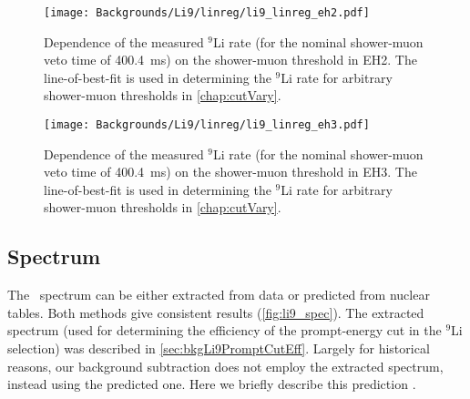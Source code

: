 \documentclass[../thesis.tex]{subfiles}
\begin{document}
\begin{figure}[ht]
  \texttt{[image: Backgrounds/Li9/linreg/li9\_linreg\_eh2.pdf]}
  \caption{Dependence of the measured $^9$Li rate (for the nominal shower-muon veto time of 400.4~ms) on the shower-muon threshold in EH2. The line-of-best-fit is used in determining the $^9$Li rate for arbitrary shower-muon thresholds in \autoref{chap:cutVary}.}
  \label{fig:li9_linreg_eh2}
\end{figure}

\begin{figure}[ht]
  \texttt{[image: Backgrounds/Li9/linreg/li9\_linreg\_eh3.pdf]}
  \caption{Dependence of the measured $^9$Li rate (for the nominal shower-muon veto time of 400.4~ms) on the shower-muon threshold in EH3. The line-of-best-fit is used in determining the $^9$Li rate for arbitrary shower-muon thresholds in \autoref{chap:cutVary}.}
  \label{fig:li9_linreg_eh3}
\end{figure}


\begin{comment}
- forming and fitting the histogram %
- - Detail the cuts we use for different muon energy ranges (prompt energy, neutron tag)
- Prompt cut efficiency
- - Extraction of spectrum. Subtraction of IBD spectrum.
- - Uncertainty
- - - Statistical - binomial confidence interval accounting for error bars on subtracted spectrum => 1-2\% (See if can find how Chris did it in code... sounds tricky)
- - - Systematic - Variations in time binning, muon PE cut in background sample => 1\%
- Neutron tag efficiency
- - Uncertainty - 45\% according to doc-10920
- - Nominal value of... 80\%? 60\%?
- Uncertainty from fit
- - Neutron tagging cutoff - 1.5e5 to 1.8e5 => 10\% (NOT IN CHRIS'S TABLE)
- - Binning => <5\% (NOT IN CHRIS'S TABLE) (MENTIONED AT END)
- - B12 => 8\%
- - He8 => 4\%
- Uncertainty of shower veto correction (He8 fraction)
- - Vary He8 fraction from 0 to 15\%
- Conversion from fit result to daily rate
- - Efficiencies of Li9 selection (ntag, pcut)
- - IBD selection efficiencies (veto, mult)
- - Shower veto correction
- - Propagation of uncertainties
\end{comment}

\subsection{Spectrum}
\label{sec:bkgLi9Spectrum}

The \LiHe\ spectrum can be either extracted from data or predicted from nuclear tables. Both methods give consistent results (\autoref{fig:li9_spec}). The extracted spectrum (used for determining the efficiency of the prompt-energy cut in the $^9$Li selection) was described in \autoref{sec:bkgLi9PromptCutEff}. Largely for historical reasons, our background subtraction does not employ the extracted spectrum, instead using the predicted one. Here we briefly describe this prediction \cite{pedroLi9Spec1,pedroLi9Spec2}.
\end{document}
